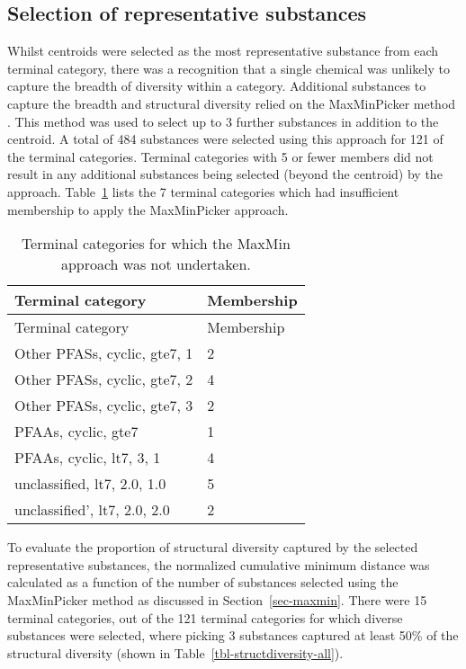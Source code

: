 \documentclass[
  super,
  preprint,
  3p]{elsarticle}
\begin{document}
\hypertarget{sec-maxmin-all}{%
\subsection{Selection of representative
substances}\label{sec-maxmin-all}}

Whilst centroids were selected as the most representative substance from
each terminal category, there was a recognition that a single chemical
was unlikely to capture the breadth of diversity within a category.
Additional substances to capture the breadth and structural diversity
relied on the MaxMinPicker method \citep{ashton_identification_2002}.
This method was used to select up to 3 further substances in addition to
the centroid. A total of 484 substances were selected using this
approach for 121 of the terminal categories. Terminal categories with 5
or fewer members did not result in any additional substances being
selected (beyond the centroid) by the approach.
Table~\ref{tbl-maxmin-cat} lists the 7 terminal categories which had
insufficient membership to apply the MaxMinPicker approach.

\hypertarget{tbl-maxmin-cat}{}
\begin{longtable}[]{@{}ll@{}}
\caption{\label{tbl-maxmin-cat}Terminal categories for which the MaxMin
approach was not undertaken.}\tabularnewline
\toprule\noalign{}
Terminal category & Membership \\
\midrule\noalign{}
\endfirsthead
\toprule\noalign{}
Terminal category & Membership \\
\midrule\noalign{}
\endhead
\bottomrule\noalign{}
\endlastfoot
Other PFASs, cyclic, gte7, 1 & 2 \\
Other PFASs, cyclic, gte7, 2 & 4 \\
Other PFASs, cyclic, gte7, 3 & 2 \\
PFAAs, cyclic, gte7 & 1 \\
PFAAs, cyclic, lt7, 3, 1 & 4 \\
unclassified, lt7, 2.0, 1.0 & 5 \\
unclassified', lt7, 2.0, 2.0 & 2 \\
\end{longtable}

To evaluate the proportion of structural diversity captured by the
selected representative substances, the normalized cumulative minimum
distance was calculated as a function of the number of substances
selected using the MaxMinPicker method as discussed in
Section~\ref{sec-maxmin}. There were 15 terminal categories, out of the
121 terminal categories for which diverse substances were selected,
where picking 3 substances captured at least 50\% of the structural
diversity (shown in Table~\ref{tbl-structdiversity-all}).
\end{document}
